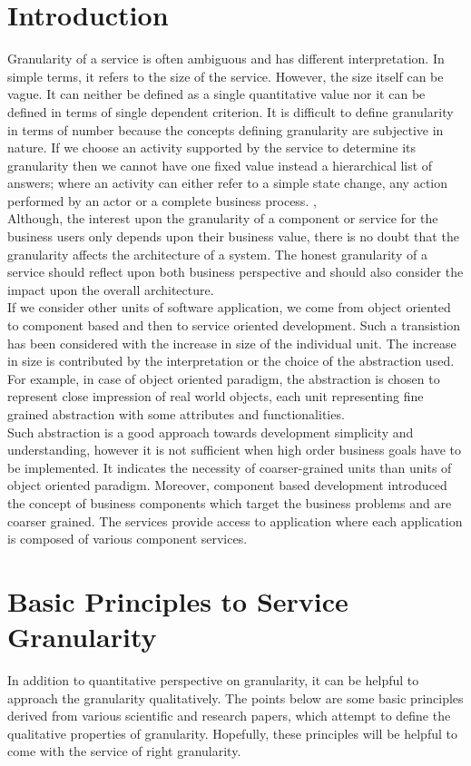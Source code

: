 \section{Introduction}\label{section:granularity/introduction}
Granularity of a service is often ambiguous and has different interpretation. In simple terms, it refers to the size of the service. However, the size itself can be vague. It can neither be defined as a single quantitative value nor it can be defined in terms of single dependent criterion. It is difficult to define granularity in terms of number because the concepts defining granularity are subjective in nature. If we choose an activity supported by the service to determine its granularity then we cannot have one fixed value instead a hierarchical list of answers; where an activity can either refer to a simple state change, any action performed by an actor or a complete business process. \cite{Linthicum:2015aa}, \cite{Raf-Haesen:2015aa}
\\
Although, the interest upon the granularity of a component or service for the business users only depends upon their business value, there is no doubt that the granularity affects the architecture of a system. The honest granularity of a service should reflect upon both business perspective and should also consider the impact upon the overall architecture.
\\
If we consider other units of software application, we come from object oriented to component based and then to service oriented development. Such a transistion has been considered with the increase in size of the individual unit. The increase in size is contributed by the interpretation or the choice of the abstraction used. For example, in case of object oriented paradigm, the abstraction is chosen to represent close impression of real world objects, each unit representing fine grained abstraction with some attributes and functionalities. 
\\
Such abstraction is a good approach towards development simplicity and understanding, however it is not sufficient when high order business goals have to be implemented. It indicates the necessity of coarser-grained units than units of object oriented paradigm. Moreover, component based development introduced the concept of business components which target the business problems and are coarser grained. The services provide access to application where each application is composed of various component services. \cite{Linthicum:2015aa}

\section{Basic Principles to Service Granularity}\label{section:granularity/principles}
In addition to quantitative perspective on granularity, it can be helpful to approach the granularity qualitatively. The points below are some basic principles derived from various scientific and research papers, which attempt to define the qualitative properties of granularity. Hopefully, these principles will be helpful to come with the service of right granularity.

